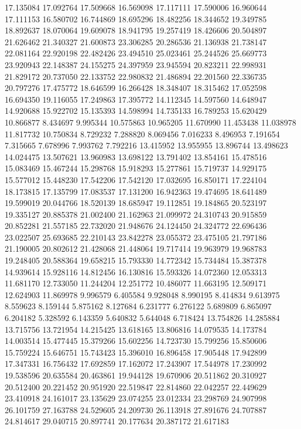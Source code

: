 17.135084
17.092764
17.509668
16.569098
17.117111
17.590006
16.960644
17.111153
16.580702
16.744869
18.695296
18.482256
18.344652
19.349785
18.892637
18.070064
19.609078
18.941795
19.257419
18.426606
20.504897
21.626462
21.340327
21.600873
23.306285
20.286536
21.136938
21.738147
22.081164
22.920198
22.482426
23.494510
25.023461
25.244526
25.669773
23.920943
22.148387
24.155275
24.397959
23.945594
20.823211
22.998931
21.829172
20.737050
22.133752
22.980832
21.486894
22.201560
22.336735
20.797276
17.475772
18.646599
16.266428
18.348407
18.315462
17.052598
16.694350
19.116055
17.249863
17.395772
14.112345
14.597560
14.648947
14.920688
15.922702
15.135393
14.598994
14.735133
16.789253
15.620429
10.866877
8.434697
9.995344
10.575863
10.965205
11.670990
11.453438
11.038978
11.817732
10.750834
8.729232
7.288820
8.069456
7.016233
8.496953
7.191654
7.315665
7.678996
7.993762
7.792216
13.415952
13.955955
13.896744
13.498623
14.024475
13.507621
13.960983
13.698122
13.791402
13.854161
15.478516
15.083469
15.467244
15.298768
15.918293
15.277861
15.719737
14.929175
15.577012
15.448230
17.542206
17.542120
17.032695
16.850171
17.224104
18.173815
17.135799
17.083537
17.131200
16.942363
19.474695
18.641489
19.599019
20.044766
18.520139
18.685947
19.112851
19.184865
20.523197
19.335127
20.885378
21.002400
21.162963
21.099972
24.310743
20.915859
20.852281
21.557185
22.732020
21.948676
24.124450
24.324772
22.696436
23.022507
25.693685
22.210143
23.842278
23.055372
23.475105
21.797186
21.190005
20.802612
21.428068
21.448064
19.717414
19.963979
19.968783
19.248405
20.588364
19.658215
15.793330
14.772342
15.734484
15.387378
14.939614
15.928116
14.812456
16.130816
15.593326
14.072360
12.053313
11.681170
12.733050
11.244204
12.251772
10.486077
11.663195
12.509171
12.624903
11.869978
9.996579
6.405584
9.928048
8.990195
8.414834
9.613975
8.559623
8.159144
5.875162
8.127684
6.231777
6.276122
5.689809
6.865097
6.204182
5.328592
6.143359
5.640832
5.644048
6.718424
13.754826
14.285884
13.715756
13.721954
14.215425
13.618165
13.806816
14.079535
14.173784
14.003514
15.477445
15.379266
15.602256
14.723730
15.799256
15.850606
15.759224
15.646751
15.743423
15.396010
16.896458
17.905448
17.942899
17.347331
16.756432
17.692859
17.162072
17.243907
17.544978
17.230992
19.538596
20.635584
20.463861
19.944128
19.670906
20.511862
20.310927
20.512400
20.221452
20.951920
22.519847
22.814860
22.042257
22.449629
23.410918
24.161017
23.135629
23.074255
23.012334
23.298769
24.907998
26.101759
27.163788
24.529605
24.209730
26.113918
27.891676
24.707887
24.814617
29.040715
20.897741
20.177634
20.387172
21.617183
